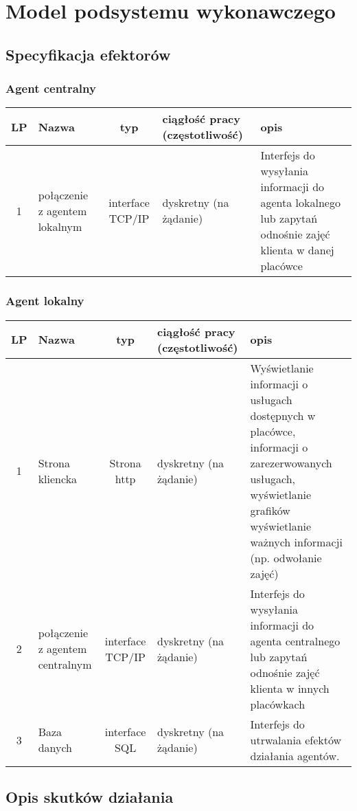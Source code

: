 \section{Model podsystemu wykonawczego}
\subsection{Specyfikacja efektorów}

\subsubsection{Agent centralny}

\begin{tabular}{c|p{3cm}|c|p{2cm}|p{4cm}}
LP		& Nazwa			& typ			& ciągłość pracy (częstotliwość) & opis \\
\hline
1		& połączenie z agentem lokalnym	& interface TCP/IP	& dyskretny (na żądanie) & Interfejs do wysyłania informacji do agenta lokalnego lub zapytań odnośnie zajęć klienta w danej placówce \\
\end{tabular}

\subsubsection{Agent lokalny}

\begin{tabular}{c|p{3cm}|c|p{2cm}|p{4cm}}
LP		& Nazwa			& typ		& ciągłość pracy (częstotliwość)	& opis \\
\hline
1		& Strona kliencka		& Strona http	& dyskretny (na żądanie)	& Wyświetlanie informacji o usługach dostępnych w placówce, informacji o zarezerwowanych usługach, wyświetlanie grafików wyświetlanie ważnych informacji (np. odwołanie zajęć)\\
2		& połączenie z agentem centralnym		& interface TCP/IP & dyskretny (na żądanie)	& Interfejs do wysyłania informacji do agenta centralnego lub zapytań odnośnie zajęć klienta w innych placówkach \\
3		& Baza danych		& interface SQL	& dyskretny (na żądanie) & Interfejs do utrwalania efektów działania agentów.
\end{tabular}



\subsection{Opis skutków działania}


